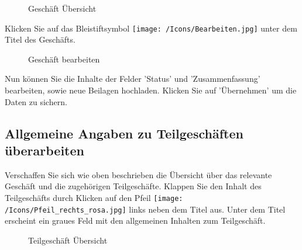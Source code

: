 \begin{figure}[H]
\caption{Geschäft Übersicht}
\end{figure}

Klicken Sie auf das Bleistiftsymbol \texttt{[image: /Icons/Bearbeiten.jpg]}  unter dem Titel des Geschäfts.

\begin{figure}[H]
\caption{Geschäft bearbeiten}
\end{figure}

Nun können Sie die Inhalte der Felder 'Status'  und 'Zusammenfassung'  bearbeiten, sowie neue Beilagen  hochladen. Klicken Sie auf 'Übernehmen'  um die Daten zu sichern.

\subsection{Allgemeine Angaben zu Teilgeschäften überarbeiten}

Verschaffen Sie sich wie oben beschrieben die Übersicht über das relevante Geschäft und die zugehörigen Teilgeschäfte. Klappen Sie den Inhalt des Teilgeschäfts durch Klicken auf den Pfeil \texttt{[image: /Icons/Pfeil\_rechts\_rosa.jpg]} links neben dem Titel aus. Unter dem Titel erscheint ein graues Feld  mit den allgemeinen Inhalten zum Teilgeschäft.

\begin{figure}[H]
\caption{Teilgeschäft Übersicht}
\end{figure}

